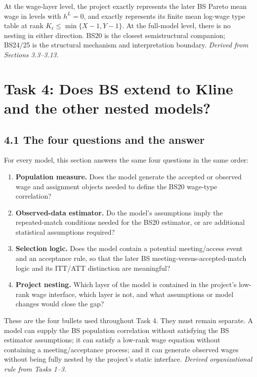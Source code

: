 \documentclass[11pt]{article}
\begin{document}
At the wage-layer level, the project exactly represents the later BS Pareto
mean wage in levels with \(h^L=0\), and exactly represents its finite mean
log-wage type table at rank
\(K_\ell\leq\min\{X-1,Y-1\}\).  At the full-model level, there is no nesting in
either direction.  BS20 is the closest semistructural companion; BS24/25 is
the structural mechanism and interpretation boundary.
\textit{Derived from Sections 3.3--3.13.}

\clearpage
\section{Task 4: Does BS extend to Kline and the other nested models?}

\subsection{4.1 The four questions and the answer}

For every model, this section answers the same four questions in the same
order:

\begin{enumerate}
\item \textbf{Population measure.}  Does the model generate the accepted or
  observed wage and assignment objects needed to define the BS20 wage-type
  correlation?
\item \textbf{Observed-data estimator.}  Do the model's assumptions imply the
  repeated-match conditions needed for the BS20 estimator, or are additional
  statistical assumptions required?
\item \textbf{Selection logic.}  Does the model contain a potential
  meeting/access event and an acceptance rule, so that the later BS
  meeting-versus-accepted-match logic and its ITT/ATT distinction are
  meaningful?
\item \textbf{Project nesting.}  Which layer of the model is contained in the
  project's low-rank wage interface, which layer is not, and what assumptions
  or model changes would close the gap?
\end{enumerate}

These are the four bullets used throughout Task 4.  They must remain separate.
A model can supply the BS population correlation without satisfying the BS
estimator assumptions; it can satisfy a low-rank wage equation without
containing a meeting/acceptance process; and it can generate observed wages
without being fully nested by the project's static interface.
\textit{Derived organizational rule from Tasks 1--3.}
\end{document}
